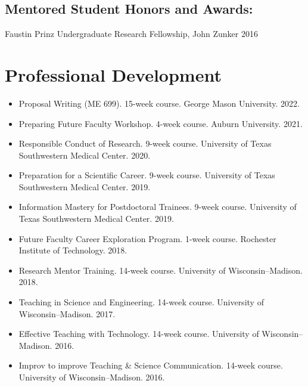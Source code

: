\documentclass[letterpaper, 10pt]{article}
\begin{document}
\subsection{Mentored Student Honors and Awards:}
Faustin Prinz Undergraduate Research Fellowship, John Zunker \hfill 2016

\section{Professional Development}
\begin{itemize}
    \item Proposal Writing (ME 699). 15-week course. George Mason University. 2022. 
    \item Preparing Future Faculty Workshop. 4-week course. Auburn University. 2021. 
    \item Responsible Conduct of Research. 9-week course. University of Texas Southwestern Medical Center. 2020. 
    \item Preparation for a Scientiﬁc Career. 9-week course. University of Texas Southwestern Medical Center. 2019. 
    \item Information Mastery for Postdoctoral Trainees. 9-week course. University of Texas Southwestern Medical Center. 2019. 
    \item Future Faculty Career Exploration Program. 1-week course. Rochester Institute of Technology. 2018. 
    \item Research Mentor Training. 14-week course. University of Wisconsin--Madison. 2018.
    \item Teaching in Science and Engineering. 14-week course. University of Wisconsin--Madison. 2017.
    \item Effective Teaching with Technology. 14-week course. University of Wisconsin--Madison. 2016.
    \item Improv to improve Teaching \& Science Communication. 14-week course. University of Wisconsin--Madison. 2016.
\end{itemize}
    
%
%
\end{document}
